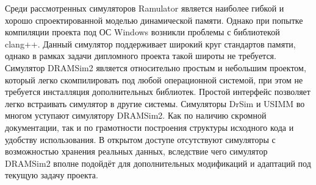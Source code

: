 Среди рассмотренных симуляторов Ramulator является наиболее гибкой и хорошо спроектированной моделью динамической памяти. Однако при попытке компиляции проекта под ОС Windows возникли проблемы с библиотекой clang++. Данный симулятор поддерживает широкий круг стандартов памяти, однако в рамках задачи дипломного проекта такой широты не требуется. Симулятор DRAMSim2 является относительно простым и небольшим проектом, который легко скомпилировать под любой операционной системой, при этом не требуется инсталляция дополнительных библиотек. Простой интерфейс позволяет легко встраивать симулятор в другие системы. Симуляторы DrSim и USIMM во многом уступают симулятору DRAMSim2. Как по наличию скромной документации, так и по грамотности построения структуры исходного кода и удобству использования. В открытом доступе отсутствуют симуляторы с возможностью хранения реальных данных, вследствие чего симулятор DRAMSim2 вполне подойдёт для дополнительных модификаций и адаптаций под текущую задачу проекта. 